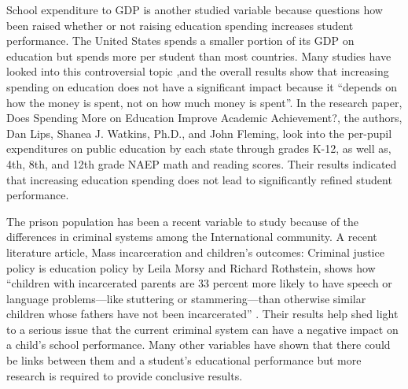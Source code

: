 \documentclass[12pt,english]{article}
\begin{document}
School expenditure to GDP is another studied variable because questions how been raised whether or not raising education spending increases student performance. The United States spends a smaller portion of its GDP on education but spends more per student than most countries. Many studies have looked into this controversial topic ,and the overall results show that increasing spending on education does not have a significant impact because it “depends on how the money is spent, not on how much money is spent”\cite{lips2008does}. In the research paper, Does Spending More on Education Improve Academic Achievement?, the authors, Dan Lips, Shanea J. Watkins, Ph.D., and John Fleming, look into the per-pupil expenditures on public education by each state through grades K-12, as well as, 4th, 8th, and 12th grade NAEP math and reading scores. Their results indicated that increasing education spending does not lead to significantly refined student performance. 

The prison population has been a recent variable to study because of the differences in criminal systems among the International community. A recent literature article, Mass incarceration and children’s outcomes: Criminal justice policy is education policy by Leila Morsy and Richard Rothstein, shows how “children with incarcerated parents are 33 percent more likely to have speech or language problems—like stuttering or stammering—than otherwise similar children whose fathers have not been incarcerated” \cite{morsy2016mass}. Their results help shed light to a serious issue that the current criminal system can have a negative impact on a child’s school performance. Many other variables have shown that there could be links between them and a student's educational performance but more research is required to provide conclusive results.
\end{document}
